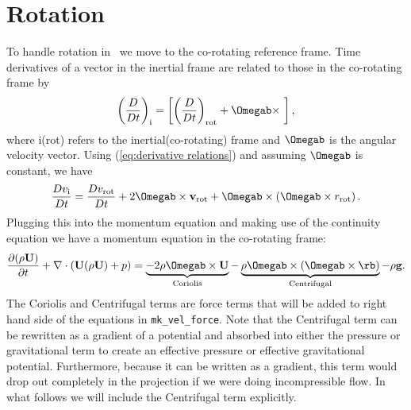 \section{Rotation}\label{Sec:Rotation}
To handle rotation in \maestro\ we move to the co-rotating reference frame.  Time
derivatives of a vector in the inertial frame are related to those in the 
co-rotating frame by
\begin{equation}\label{eq:derivative relations}
  \left(\frac{D}{Dt}\right)_\text{i} = 
  \left[\left(\frac{D}{Dt}\right)_\text{rot} + \Omegab\times\ \right],
\end{equation}
where i(rot) refers to the inertial(co-rotating) frame and $\Omegab$ is
the angular velocity vector.  Using (\ref{eq:derivative relations}) and 
assuming $\Omegab$ is constant, we have
\begin{equation}\label{eq:rotational velocity relation}
  \frac{Dv_\text{i}}{Dt} = \frac{Dv_\text{rot}}{Dt} + 
  2\Omegab \times \mathbf{v_\text{rot}} +
  \Omegab\times\left(\Omegab\times r_\text{rot}\right).
\end{equation}
Plugging this into the momentum equation and making use of the continuity 
equation we have a momentum equation in the co-rotating frame:
\begin{equation}\label{eq:momentum equation with rotation}
  \frac{\partial(\rho\mathbf{U})}{\partial t} + 
  \nabla\cdot\left(\mathbf{U}(\rho\mathbf{U}) + p \right) = 
  \underbrace{-2\rho\Omegab\times\mathbf{U}}_{\text{Coriolis}} -
  \underbrace{\rho\Omegab\times\left(\Omegab\times
    \rb\right)}_{\text{Centrifugal}} - 
  \rho \mathbf{g}.
\end{equation}
The Coriolis and Centrifugal terms are force terms that will be added to 
right hand side of the equations in {\tt mk\_vel\_force}.  Note that the 
Centrifugal term can be rewritten as a gradient of a potential and absorbed
into either the pressure or gravitational term to create an effective pressure
or effective gravitational potential.  Furthermore, because it can be written
as a gradient, this term would drop out completely in the projection if we were
doing incompressible flow.
In what follows we will include the Centrifugal term explicitly.

